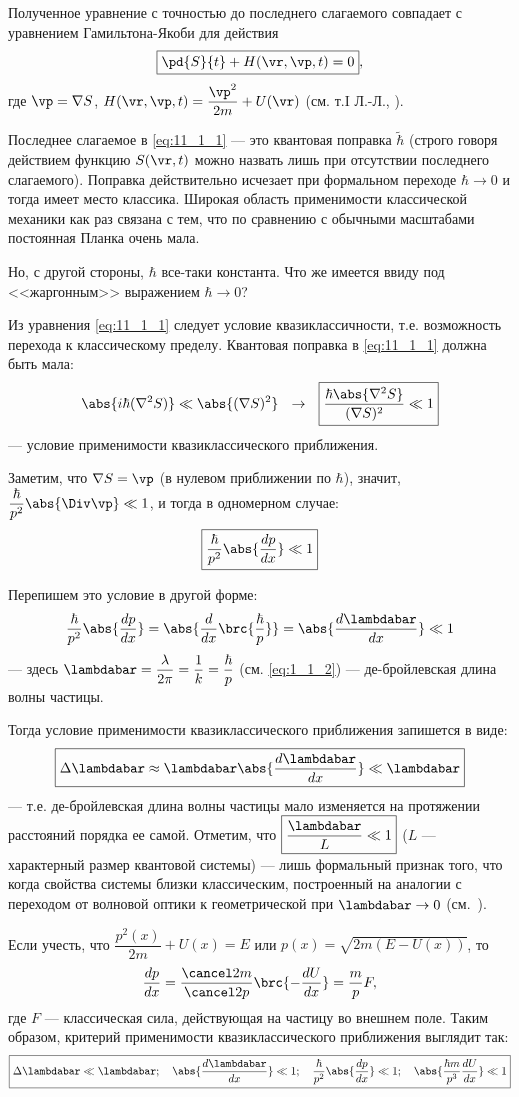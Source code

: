 Полученное уравнение с точностью до последнего слагаемого совпадает с уравнением Гамильтона-Якоби для действия 
$$
\boxed{\pd{S}{t} + H(\vr,\vp,t) = 0},
$$
где $\vp=\nabla S$, $H(\vr,\vp,t) = \dfrac{\vp^2}{2m} + U(\vr)$ (см. т.I Л.-Л., ).

Последнее слагаемое в \eqref{eq:11_1_1} --- это квантовая поправка $\tilde \hbar$ (строго говоря действием функцию $S(\vr, t)$ можно назвать лишь при отсутствии последнего слагаемого). Поправка действительно исчезает при формальном переходе $\hbar \to 0$ и тогда имеет место классика. Широкая область применимости классической механики как раз связана с тем, что по сравнению с обычными масштабами постоянная Планка очень мала.

Но, с другой стороны, $\hbar$ все-таки константа. Что же имеется ввиду под <<жаргонным>> выражением $\hbar \to 0$?

Из уравнения \eqref{eq:11_1_1} следует условие квазиклассичности, т.е. возможность перехода к классическому пределу. Квантовая поправка в \eqref{eq:11_1_1} должна быть мала:
$$
\abs{i\hbar(\nabla^2 S)} \ll \abs{(\nabla S)^2} ~~\rightarrow~~ \boxed{\frac{\hbar \abs{\nabla^2 S}}{(\nabla S)^2} \ll 1} 
$$
--- условие применимости квазиклассического приближения.

Заметим, что $\nabla S =\vp$ (в нулевом приближении по $\hbar$), значит, $\dfrac{\hbar}{p^2}\abs{\Div \vp} \ll 1$, и тогда в одномерном случае:
$$
\boxed{\frac{\hbar}{p^2}\abs{\frac{dp}{dx}} \ll 1}
$$

Перепишем это условие в другой форме:
$$
\frac{\hbar}{p^2} \abs{\frac{dp}{dx}} = 
\abs{\frac{d}{dx}\brc{\frac{\hbar}{p}}} = \abs{\frac{d\lambdabar}{dx}} \ll 1
$$
--- здесь $\lambdabar = \dfrac{\lambda}{2\pi} = \dfrac{1}{k} = \dfrac{\hbar}{p}$ (см. \eqref{eq:1_1_2}) --- де-бройлевская длина волны частицы.

Тогда условие применимости квазиклассического приближения запишется в виде:
$$
\boxed{\Delta \lambdabar \approx \lambdabar \abs{\frac{d\lambdabar}{dx}} \ll \lambdabar}
$$
--- т.е. де-бройлевская длина волны частицы мало изменяется на протяжении расстояний порядка ее самой. Отметим, что $\boxed{\frac{\lambdabar}{L} \ll 1}$ ($L$ --- характерный размер квантовой системы) --- лишь формальный признак того, что когда свойства системы близки  классическим, построенный на аналогии с переходом от волновой оптики к геометрической при $\lambdabar \to 0$ (см.~).

Если учесть, что $\dfrac{p^2(x)}{2m} + U(x) = E$ или $p(x)=\sqrt{2m(E-U(x))}$, то 
$$
\frac{dp}{dx}=\frac{\cancel 2m}{\cancel 2 p}\brc{-\frac{dU}{dx}} = \frac{m}{p}F,
$$
где $F$ --- классическая сила, действующая на частицу во внешнем поле. Таким образом, критерий применимости квазиклассического приближения выглядит так:
$$
\boxed{\Delta \lambdabar \ll \lambdabar;~~~\abs{\frac{d\lambdabar}{dx}} \ll 1;~~~\frac{\hbar}{p^2} \abs{\frac{dp}{dx}} \ll 1; ~~~\abs{\frac{\hbar m}{p^3} \frac{dU}{dx}} \ll 1 }
$$

